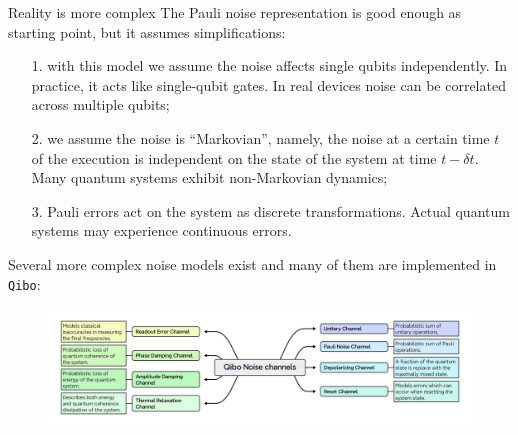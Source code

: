 \documentclass[aspectratio=169, 8pt, xcolor={svgnames}, hyperref={linkcolor=black}]{beamer}
\begin{document}
\begin{frame}{Reality is more complex}
The Pauli noise representation is good enough as starting point, but it assumes simplifications: \pause
\begin{itemize}[noitemsep]
\item[1.] with this model we assume the noise affects single qubits independently. In practice, it 
acts like single-qubit gates. \textcolor{carnelian}{In real devices noise can be 
correlated across multiple qubits}; \pause
\item[2.] we assume the noise is ``Markovian'', namely, the noise at a certain time $t$
of the execution is independent on the state of the system at time $t-\delta t$. 
\textcolor{carnelian}{Many quantum systems exhibit non-Markovian dynamics}; \pause
\item[3.] Pauli errors act on the system as discrete transformations. 
\textcolor{carnelian}{Actual quantum systems may experience continuous errors}. \pause
\end{itemize}
Several more complex noise models exist and many of them are implemented in \texttt{Qibo}: \pause
\begin{figure}
    \includegraphics[width=1\textwidth]{figures/qibo_noise_channels.png}
\end{figure}
\end{frame}
\end{document}

